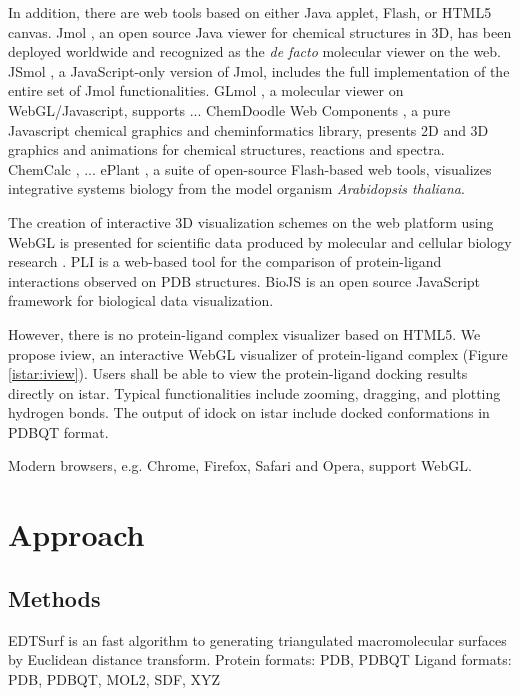 \documentclass{bioinfo}
\begin{document}
In addition, there are web tools based on either Java applet, Flash, or HTML5 canvas. Jmol \citep{1263}, an open source Java viewer for chemical structures in 3D, has been deployed worldwide and recognized as the \textit{de facto} molecular viewer on the web. JSmol \citep{1314}, a JavaScript-only version of Jmol, includes the full implementation of the entire set of Jmol functionalities. GLmol \citep{1319}, a molecular viewer on WebGL/Javascript, supports ... ChemDoodle Web Components \citep{1264}, a pure Javascript chemical graphics and cheminformatics library, presents 2D and 3D graphics and animations for chemical structures, reactions and spectra. ChemCalc \citep{}, ... ePlant \citep{1242}, a suite of open-source Flash-based web tools, visualizes integrative systems biology from the model organism \textit{Arabidopsis thaliana}.

The creation of interactive 3D visualization schemes on the web platform using WebGL is presented for scientific data produced by molecular and cellular biology research \citep{1262}. PLI \citep{1288} is a web-based tool for the comparison of protein-ligand interactions observed on PDB structures. BioJS \citep{1308} is an open source JavaScript framework for biological data visualization.

However, there is no protein-ligand complex visualizer based on HTML5. We propose iview, an interactive WebGL visualizer of protein-ligand complex (Figure \ref{istar:iview}). Users shall be able to view the protein-ligand docking results directly on istar. Typical functionalities include zooming, dragging, and plotting hydrogen bonds. The output of idock on istar include docked conformations in PDBQT format.

Modern browsers, e.g. Chrome, Firefox, Safari and Opera, support WebGL.

\section{Approach}


\begin{methods}
\section{Methods}

EDTSurf \citep{1297} is an fast algorithm to generating triangulated macromolecular surfaces by Euclidean distance transform.
Protein formats: PDB, PDBQT
Ligand formats: PDB, PDBQT, MOL2, SDF, XYZ

\end{methods}
\end{document}
